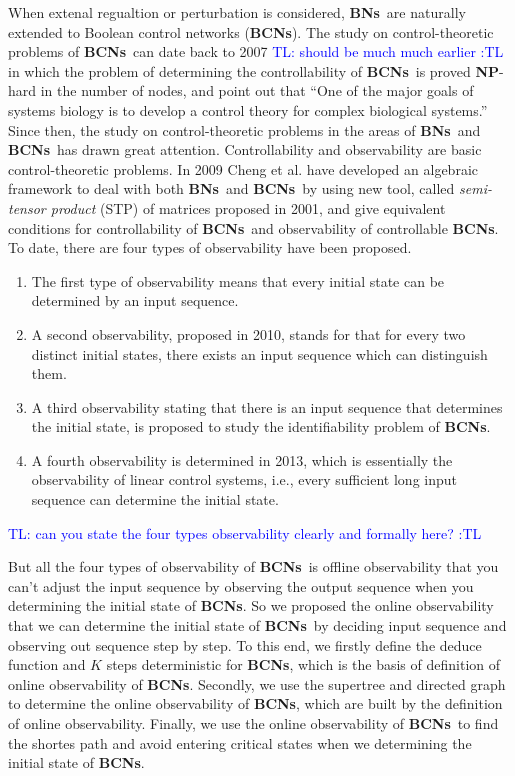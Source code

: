 \documentclass[letterpaper, 10 pt, conference]{ieeeconf}  %
\def \BNs {{\bf BNs}}
\def \BCNs {{\bf BCNs}}
\newcommand{\tl}[1]{\textcolor{blue} {TL: #1 :TL} }
\begin{document}
When extenal regualtion or perturbation is considered, \BNs\ are naturally extended to Boolean control networks ({\bf BCNs}). The study on control-theoretic problems of \BCNs\ can date back to 2007 \tl{should be much much earlier} in which the problem of determining the controllability of \BCNs\ is proved {\bf NP}-hard in the number of nodes, and point out that ``One of the major goals of systems biology is to develop a control theory for complex biological systems.'' Since then, the study on control-theoretic problems in the areas of \BNs\ and \BCNs\ has drawn great attention. Controllability and observability are basic control-theoretic problems. In 2009 Cheng et al. have developed an algebraic framework to deal with both \BNs\ and \BCNs\ by using new tool, called \emph{semi-tensor product} (STP) of matrices proposed in 2001, and give equivalent conditions for controllability of \BCNs\ and observability of controllable {\bf BCNs}. To date, there are four types of observability have been proposed. 

\begin{enumerate}
	\item The first type of observability means that every initial state can be determined by an input sequence.
	
	\item 
	A second observability, proposed in 2010, stands for that for every two distinct initial states, there exists an input sequence which can distinguish them.
	
	\item A third observability stating that there is an input sequence that determines the initial state, is proposed to study the identifiability problem of {\bf BCNs}.
	
	\item  A fourth observability is determined in 2013, which is essentially the observability of linear control systems, i.e., every sufficient long input sequence can determine the initial state.
\end{enumerate}
 

\tl{can you state the four types observability clearly and formally here?}

But all the four types of observability of \BCNs\ is offline observability that you can't adjust the input sequence by observing the output sequence when you determining the initial state of {\bf BCNs}. So we proposed the online observability that we can determine the initial state of \BCNs\ by deciding input sequence and observing out sequence step by step. To this end, we firstly define the deduce function and $K$ steps deterministic for {\bf BCNs}, which is the basis of definition of online observability of {\bf BCNs}. Secondly, we use the supertree and directed graph to determine the online observability of {\bf BCNs}, which are built by the definition of online observability. Finally, we use the online observability of \BCNs\ to find the shortes path and avoid entering critical states when we determining the initial state of {\bf BCNs}. 
\end{document}
